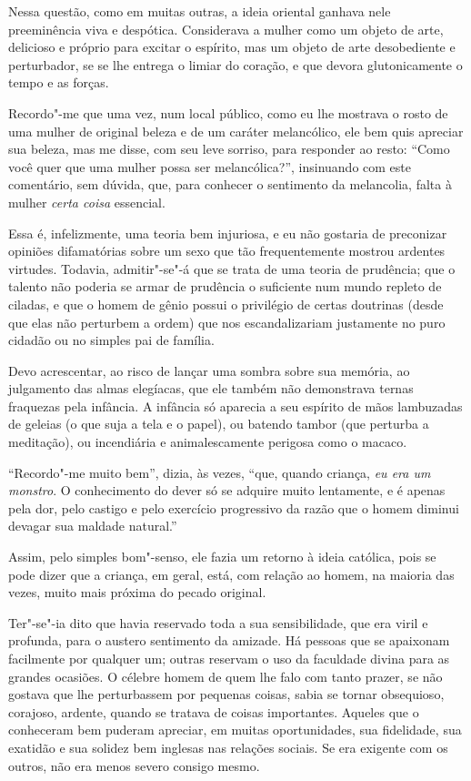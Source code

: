 Nessa questão, como em muitas outras, a ideia oriental ganhava nele
preeminência viva e despótica. Considerava a mulher como um objeto de
arte, delicioso e próprio para excitar o espírito, mas um objeto de
arte desobediente e perturbador, se se lhe entrega o limiar do coração,
e que devora glutonicamente o tempo e as forças.

Recordo"-me que uma vez, num local público, como eu lhe mostrava o rosto
de uma mulher de original beleza e de um caráter melancólico, ele bem
quis apreciar sua beleza, mas me disse, com seu leve sorriso, para
responder ao resto: ``Como você quer que uma mulher possa
ser melancólica?'', insinuando com este comentário, sem
dúvida, que, para conhecer o sentimento da melancolia, falta à mulher
\textit{certa coisa }essencial.

Essa é, infelizmente, uma teoria bem injuriosa, e eu não gostaria de
preconizar opiniões difamatórias sobre um sexo que tão frequentemente
mostrou ardentes virtudes. Todavia, admitir"-se"-á que se trata de uma
teoria de prudência; que o talento não poderia se armar de prudência o
suficiente num mundo repleto de ciladas, e que o homem de gênio possui
o privilégio de certas doutrinas (desde que elas não perturbem a ordem)
que nos escandalizariam justamente no puro cidadão ou no simples pai de
família.

Devo acrescentar, ao risco de lançar uma sombra sobre sua memória, ao
julgamento das almas elegíacas, que ele também não demonstrava ternas
fraquezas pela infância. A infância só aparecia a seu espírito de mãos
lambuzadas de geleias (o que suja a tela e o papel), ou batendo tambor
(que perturba a meditação), ou incendiária e animalescamente perigosa
como o macaco.

``Recordo"-me muito bem'', dizia, às vezes,
``que, quando criança, \textit{eu era um monstro}. O
conhecimento do dever só se adquire muito lentamente, e é apenas pela
dor, pelo castigo e pelo exercício progressivo da razão que o homem
diminui devagar sua maldade natural.''

Assim, pelo simples bom"-senso, ele fazia um retorno à ideia católica,
pois se pode dizer que a criança, em geral, está, com relação ao homem,
na maioria das vezes, muito mais próxima do pecado original.

\sectionitem

Ter"-se"-ia dito que  havia reservado toda a sua sensibilidade,
que era viril e profunda, para o austero sentimento da amizade. Há
pessoas que se apaixonam facilmente por qualquer um; outras reservam o
uso da faculdade divina para as grandes ocasiões. O célebre homem de
quem lhe falo com tanto prazer, se não gostava que lhe perturbassem por
pequenas coisas, sabia se tornar obsequioso, corajoso, ardente, quando
se tratava de coisas importantes. Aqueles que o conheceram bem puderam
apreciar, em muitas oportunidades, sua fidelidade, sua exatidão e sua
solidez bem inglesas nas relações sociais. Se era exigente com os
outros, não era menos severo consigo mesmo.

